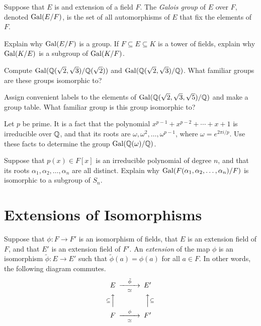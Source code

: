 \begin{definition}
    Suppose that $E$ is and extension of a field $F$. The \textit{Galois group} of $E$ over $F$, denoted $\operatorname{Gal}(E/F)$, is the set of all automorphisms of $E$ that fix the elements of $F$.
\end{definition}

\begin{problem}
    Explain why $\operatorname{Gal}(E/F)$ is a group. If $F\subseteq E\subseteq K$ is a tower of fields, explain why $\operatorname{Gal}(K/E)$ is a subgroup of $\operatorname{Gal}(K/F)$.
\end{problem}



\begin{problem}
    Compute $\operatorname{Gal}(\mathbb{Q}(\sqrt{2},\sqrt{3})/\mathbb{Q}(\sqrt{2}))$ and $\operatorname{Gal}(\mathbb{Q}(\sqrt{2},\sqrt{3})/\mathbb{Q})$. What familiar groups are these groups isomorphic to?
\end{problem}



\begin{problem}
    Assign convenient labels to the elements of $\operatorname{Gal}(\mathbb{Q}(\sqrt{2},\sqrt{3},\sqrt{5})/\mathbb{Q})$ and make a group table. What familiar group is this group isomorphic to?
\end{problem}



\begin{problem}
    Let $p$ be prime. It is a fact that the polynomial $x^{p-1}+x^{p-2}+\cdots+x+1$ is irreducible over $\mathbb{Q}$, and that its roots are $\omega,\omega^2,\ldots,\omega^{p-1}$, where $\omega = e^{2\pi i/p}$. Use these facts to determine the group $\operatorname{Gal}(\mathbb{Q}(\omega)/\mathbb{Q})$.
\end{problem}



\begin{problem}
    Suppose that $p(x)\in F[x]$ is an irreducible polynomial of degree $n$, and that its roots $\alpha_1,\alpha_2,\ldots,\alpha_n$ are all distinct. Explain why $\operatorname{Gal}(F(\alpha_1,\alpha_2,\ldots,\alpha_n)/F)$ is isomorphic to a subgroup of $S_n$.
\end{problem}


\section{Extensions of Isomorphisms}

\begin{definition}
    Suppose that $\phi:F \longrightarrow F'$ is an isomorphism of fields, that $E$ is an extension field of $F$, and that $E'$ is an extension field of $F'$. An \textit{extension} of the map $\phi$ is an isomorphism $\tilde{\phi}:E\longrightarrow E'$ such that $\tilde{\phi}(a)=\phi(a)$ for all $a\in F$. In other words, the following diagram commutes.
    $$
    \begin{CD}
        E              @>\tilde{\phi}>\simeq>   E' \\
        @A\subseteq AA                          @AA\subseteq A \\
        F              @>\phi>\simeq>           F'
    \end{CD}
    $$
\end{definition}

